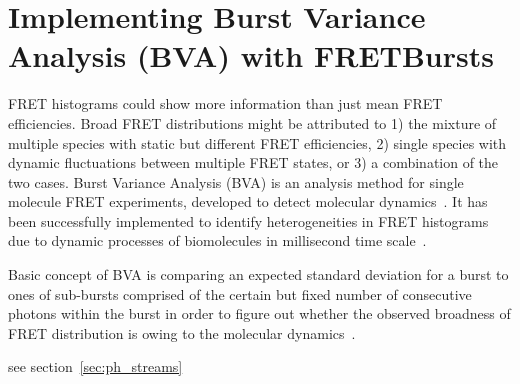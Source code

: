 \section{Implementing Burst Variance Analysis (BVA) with FRETBursts}

FRET histograms could show more information than just mean FRET efficiencies. Broad FRET distributions might be attributed to 1) the mixture of multiple species with static but different FRET efficiencies, 2) single species with dynamic fluctuations between multiple FRET states, or 3) a combination of the two cases. Burst Variance Analysis (BVA) is an analysis method for single molecule FRET experiments, developed to detect molecular dynamics~\cite{Torella_2011}. It has been successfully implemented to identify heterogeneities in FRET histograms due to dynamic processes of biomolecules in millisecond time scale~\cite{Torella_2011, Robb_2013}.

Basic concept of BVA is comparing an expected standard deviation for a burst to ones of sub-bursts comprised of the certain but fixed number of consecutive photons within the burst in order to figure out whether the observed broadness of FRET distribution is owing to the molecular dynamics~\cite{Torella_2011}. 

see section~\ref{sec:ph_streams}